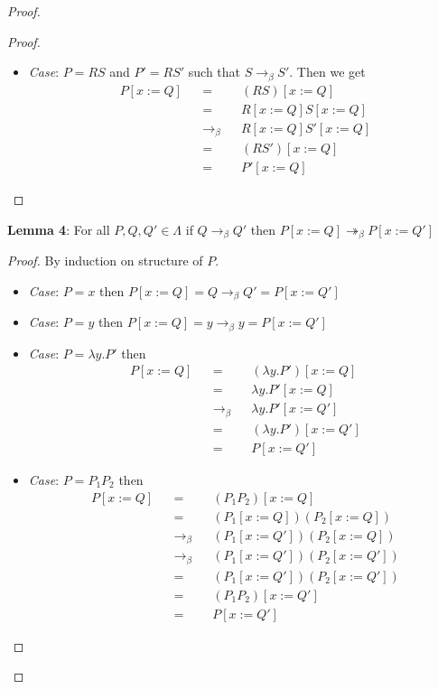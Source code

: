 \documentclass[12pt]{article}
\begin{document}
\begin{proof}
\begin{proof}
\begin{itemize}
\item \textsl{Case}: $P = R S$ and $P' = R S'$ such that $S \rightarrow_\beta S'$. Then we get
\begin{align*}
    P[x:=Q] &&=&& (R S)[x:=Q] \\
    &&=&& R[x:=Q] S[x:=Q] \\
    &&\rightarrow_\beta&& R[x:=Q] S'[x:=Q] \\
    &&=&& (R S')[x:=Q] \\
    &&=&& P'[x:=Q]
\end{align*}
\end{itemize}
\end{proof}

\textbf{Lemma 4}: For all $P,Q,Q' \in \Lambda$ if $Q \rightarrow_{\beta} Q'$ then $P[x:=Q] \twoheadrightarrow_{\beta} P[x:=Q']$
\begin{proof}
By induction on structure of $P$.

\begin{itemize}
\item \textsl{Case}: $P=x$ then $P[x:=Q] = Q \rightarrow_{\beta} Q' = P[x:=Q']$ \\
\item \textsl{Case}: $P=y$ then $P[x:=Q] = y \rightarrow_{\beta} y = P[x:=Q']$ \\
\item \textsl{Case}: $P=\lambda y.P'$ then
\begin{align*}
    P[x:=Q] &&=&& (\lambda y.P')[x:=Q] \\
    &&=&& \lambda y.P'[x:=Q] \\
    &&\rightarrow_{\beta}&&  \lambda y.P'[x:=Q'] \\
    &&=&& (\lambda y.P')[x:=Q'] \\
    &&=&& P[x:=Q']
\end{align*}
\item \textsl{Case}: $P = P_1 P_2$ then
\begin{align*}
    P[x:=Q] &&=&& (P_1 P_2)[x:=Q] \\
    &&=&&  (P_1[x:=Q])(P_2[x:=Q]) \\
    &&\rightarrow_{\beta}&& (P_1[x:=Q'])(P_2[x:=Q]) \\
    &&\rightarrow_{\beta}&& (P_1[x:=Q'])(P_2[x:=Q']) \\
    &&=&&  (P_1[x:=Q'])(P_2[x:=Q']) \\
    &&=&& (P_1 P_2)[x:=Q'] \\
    &&=&& P[x:=Q']
\end{align*}
\end{itemize}
\end{proof}


\end{proof}
\end{document}
